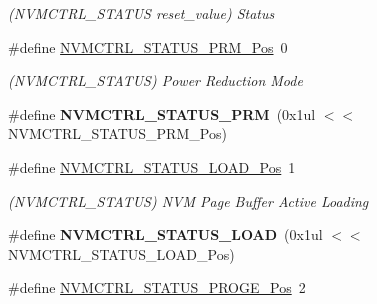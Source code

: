 \begin{DoxyCompactItemize}
\begin{DoxyCompactList}\small\item\em (N\+V\+M\+C\+T\+R\+L\+\_\+\+S\+T\+A\+T\+U\+S reset\+\_\+value) Status \end{DoxyCompactList}\item 
\hypertarget{group___s_a_m_l21___n_v_m_c_t_r_l_gab7f1c04b15d3c4fc8c9ab4bfbfd0731c}{}\#define \hyperlink{group___s_a_m_l21___n_v_m_c_t_r_l_gab7f1c04b15d3c4fc8c9ab4bfbfd0731c}{N\+V\+M\+C\+T\+R\+L\+\_\+\+S\+T\+A\+T\+U\+S\+\_\+\+P\+R\+M\+\_\+\+Pos}~0\label{group___s_a_m_l21___n_v_m_c_t_r_l_gab7f1c04b15d3c4fc8c9ab4bfbfd0731c}

\begin{DoxyCompactList}\small\item\em (N\+V\+M\+C\+T\+R\+L\+\_\+\+S\+T\+A\+T\+U\+S) Power Reduction Mode \end{DoxyCompactList}\item 
\hypertarget{group___s_a_m_l21___n_v_m_c_t_r_l_gaf0aef4e5cc8a239d347d60eec6c4cac2}{}\#define {\bfseries N\+V\+M\+C\+T\+R\+L\+\_\+\+S\+T\+A\+T\+U\+S\+\_\+\+P\+R\+M}~(0x1ul $<$$<$ N\+V\+M\+C\+T\+R\+L\+\_\+\+S\+T\+A\+T\+U\+S\+\_\+\+P\+R\+M\+\_\+\+Pos)\label{group___s_a_m_l21___n_v_m_c_t_r_l_gaf0aef4e5cc8a239d347d60eec6c4cac2}

\item 
\hypertarget{group___s_a_m_l21___n_v_m_c_t_r_l_gaf65957fca966956aebcb205a480376cf}{}\#define \hyperlink{group___s_a_m_l21___n_v_m_c_t_r_l_gaf65957fca966956aebcb205a480376cf}{N\+V\+M\+C\+T\+R\+L\+\_\+\+S\+T\+A\+T\+U\+S\+\_\+\+L\+O\+A\+D\+\_\+\+Pos}~1\label{group___s_a_m_l21___n_v_m_c_t_r_l_gaf65957fca966956aebcb205a480376cf}

\begin{DoxyCompactList}\small\item\em (N\+V\+M\+C\+T\+R\+L\+\_\+\+S\+T\+A\+T\+U\+S) N\+V\+M Page Buffer Active Loading \end{DoxyCompactList}\item 
\hypertarget{group___s_a_m_l21___n_v_m_c_t_r_l_gade5ff44980a885bebf5604ac806a2900}{}\#define {\bfseries N\+V\+M\+C\+T\+R\+L\+\_\+\+S\+T\+A\+T\+U\+S\+\_\+\+L\+O\+A\+D}~(0x1ul $<$$<$ N\+V\+M\+C\+T\+R\+L\+\_\+\+S\+T\+A\+T\+U\+S\+\_\+\+L\+O\+A\+D\+\_\+\+Pos)\label{group___s_a_m_l21___n_v_m_c_t_r_l_gade5ff44980a885bebf5604ac806a2900}

\item 
\hypertarget{group___s_a_m_l21___n_v_m_c_t_r_l_gaf78e886e6aa15d5f0d4324f02d46388a}{}\#define \hyperlink{group___s_a_m_l21___n_v_m_c_t_r_l_gaf78e886e6aa15d5f0d4324f02d46388a}{N\+V\+M\+C\+T\+R\+L\+\_\+\+S\+T\+A\+T\+U\+S\+\_\+\+P\+R\+O\+G\+E\+\_\+\+Pos}~2\label{group___s_a_m_l21___n_v_m_c_t_r_l_gaf78e886e6aa15d5f0d4324f02d46388a}


\end{DoxyCompactItemize}
